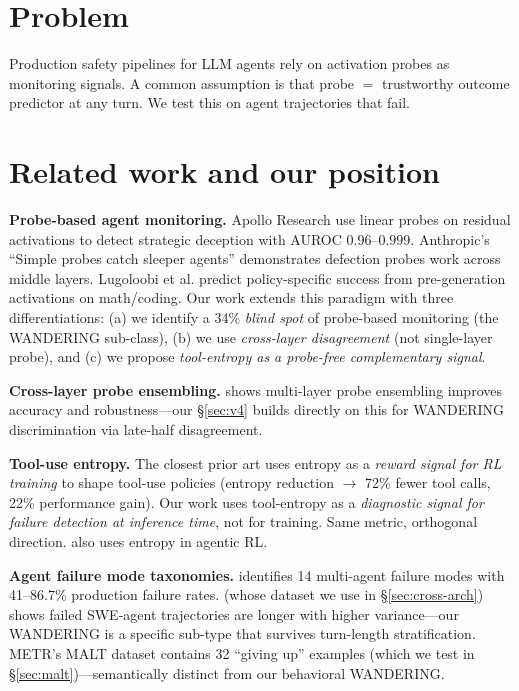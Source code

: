 \documentclass[11pt]{article}
\begin{document}
\section{Problem}

Production safety pipelines for LLM agents rely on activation probes as monitoring signals. A common assumption is that probe $=$ trustworthy outcome predictor at any turn. We test this on agent trajectories that fail.

\section{Related work and our position}

\textbf{Probe-based agent monitoring.} Apollo Research \cite{apollo_deception_2025} use linear probes on residual activations to detect strategic deception with AUROC $0.96$--$0.999$. Anthropic's ``Simple probes catch sleeper agents'' \cite{anthropic_sleeper_2024} demonstrates defection probes work across middle layers. Lugoloobi et al. \cite{lugoloobi_2026} predict policy-specific success from pre-generation activations on math/coding. Our work extends this paradigm with three differentiations: (a) we identify a 34\% \emph{blind spot} of probe-based monitoring (the WANDERING sub-class), (b) we use \emph{cross-layer disagreement} (not single-layer probe), and (c) we propose \emph{tool-entropy as a probe-free complementary signal}.

\textbf{Cross-layer probe ensembling.} \cite{multilayer_ensemble_2026} shows multi-layer probe ensembling improves accuracy and robustness---our \S\ref{sec:v4} builds directly on this for WANDERING discrimination via late-half disagreement.

\textbf{Tool-use entropy.} The closest prior art \cite{entropy_tool_use_2026} uses entropy as a \emph{reward signal for RL training} to shape tool-use policies (entropy reduction $\rightarrow$ 72\% fewer tool calls, 22\% performance gain). Our work uses tool-entropy as a \emph{diagnostic signal for failure detection at inference time}, not for training. Same metric, orthogonal direction. \cite{aepo_2025} also uses entropy in agentic RL.

\textbf{Agent failure mode taxonomies.} \cite{mast_2025} identifies 14 multi-agent failure modes with 41--86.7\% production failure rates. \cite{jetbrains_2025} (whose dataset we use in \S\ref{sec:cross-arch}) shows failed SWE-agent trajectories are longer with higher variance---our WANDERING is a specific sub-type that survives turn-length stratification. METR's MALT dataset \cite{malt_2025} contains 32 ``giving up'' examples (which we test in \S\ref{sec:malt})---semantically distinct from our behavioral WANDERING.
\end{document}
